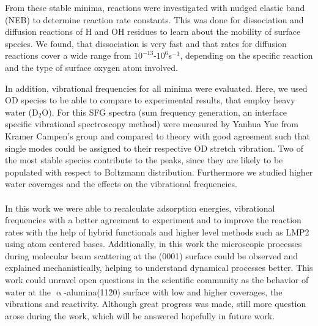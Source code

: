 \documentclass[11pt,DIV=13,a4paper,headinclude]{scrartcl}
\begin{document}
From these stable minima, reactions were investigated with nudged elastic band (NEB) to determine reaction rate constants.
This was done for dissociation and diffusion reactions of H and OH residues to learn about the mobility of surface species.
We found, that dissociation is very fast and that rates for diffusion reactions cover a wide range from $10^{-13}$-$10^6$s$^{-1}$, depending on the specific reaction and the type of surface oxygen atom involved. 


In addition, vibrational frequencies for all minima were evaluated.
Here, we used OD species to be able to compare to experimental results, that employ heavy water (D$_2$O).
For this SFG spectra (sum frequency generation, an interface specific vibrational spectroscopy method) were measured by Yanhua Yue from Kramer Campen's group and compared to theory with good agreement such that single modes could be assigned to their respective OD stretch vibration.
Two of the most stable species contribute to the peaks, since they are likely to be populated with respect to Boltzmann distribution.
Furthermore we studied higher water coverages and the effects on the vibrational frequencies.
% 
% 
\\
\\
In this work we were able to recalculate adsorption energies, vibrational frequencies with a better agreement to experiment and to improve the reaction rates with the help of hybrid functionals and higher level methods such as LMP2 using atom centered bases.
Additionally, in this work the microscopic processes during molecular beam scattering at the (0001) surface could be observed and explained mechanistically, helping to understand dynamical processes better.
This work could unravel open questions in the scientific community as the behavior of water at the $\upalpha$-alumina(11\=20) surface with low and higher coverages, the vibrations and reactivity.
Although great progress was made, still more question arose during the work, which will be answered hopefully in future work.
\end{document}
